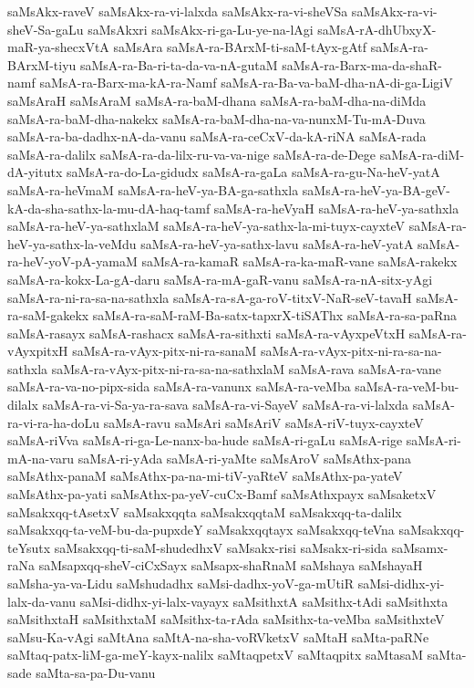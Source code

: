 {saMsAkx-raveV
saMsAkx-ra-vi-lalxda
saMsAkx-ra-vi-sheVSa
saMsAkx-ra-vi-sheV-Sa-gaLu
saMsAkxri
saMsAkx-ri-ga-Lu-ye-na-lAgi
saMsA-rA-dhUbxyX-maR-ya-shecxVtA
saMsAra
saMsA-ra-BArxM-ti-saM-tAyx-gAtf
saMsA-ra-BArxM-tiyu
saMsA-ra-Ba-ri-ta-da-va-nA-gutaM
saMsA-ra-Barx-ma-da-shaR-namf
saMsA-ra-Barx-ma-kA-ra-Namf
saMsA-ra-Ba-va-baM-dha-nA-di-ga-LigiV
saMsAraH
saMsAraM
saMsA-ra-baM-dhana
saMsA-ra-baM-dha-na-diMda
saMsA-ra-baM-dha-nakekx
saMsA-ra-baM-dha-na-va-nunxM-Tu-mA-Duva
saMsA-ra-ba-dadhx-nA-da-vanu
saMsA-ra-ceCxV-da-kA-riNA
saMsA-rada
saMsA-ra-dalilx
saMsA-ra-da-lilx-ru-va-va-nige
saMsA-ra-de-Dege
saMsA-ra-diM-dA-yitutx
saMsA-ra-do-La-gidudx
saMsA-ra-gaLa
saMsA-ra-gu-Na-heV-yatA
saMsA-ra-heVmaM
saMsA-ra-heV-ya-BA-ga-sathxla
saMsA-ra-heV-ya-BA-geV-kA-da-sha-sathx-la-mu-dA-haq-tamf
saMsA-ra-heVyaH
saMsA-ra-heV-ya-sathxla
saMsA-ra-heV-ya-sathxlaM
saMsA-ra-heV-ya-sathx-la-mi-tuyx-cayxteV
saMsA-ra-heV-ya-sathx-la-veMdu
saMsA-ra-heV-ya-sathx-lavu
saMsA-ra-heV-yatA
saMsA-ra-heV-yoV-pA-yamaM
saMsA-ra-kamaR
saMsA-ra-ka-maR-vane
saMsA-rakekx
saMsA-ra-kokx-La-gA-daru
saMsA-ra-mA-gaR-vanu
saMsA-ra-nA-sitx-yAgi
saMsA-ra-ni-ra-sa-na-sathxla
saMsA-ra-sA-ga-roV-titxV-NaR-seV-tavaH
saMsA-ra-saM-gakekx
saMsA-ra-saM-raM-Ba-satx-tapxrX-tiSAThx
saMsA-ra-sa-paRna
saMsA-rasayx
saMsA-rashacx
saMsA-ra-sithxti
saMsA-ra-vAyxpeVtxH
saMsA-ra-vAyxpitxH
saMsA-ra-vAyx-pitx-ni-ra-sanaM
saMsA-ra-vAyx-pitx-ni-ra-sa-na-sathxla
saMsA-ra-vAyx-pitx-ni-ra-sa-na-sathxlaM
saMsA-rava
saMsA-ra-vane
saMsA-ra-va-no-pipx-sida
saMsA-ra-vanunx
saMsA-ra-veMba
saMsA-ra-veM-bu-dilalx
saMsA-ra-vi-Sa-ya-ra-sava
saMsA-ra-vi-SayeV
saMsA-ra-vi-lalxda
saMsA-ra-vi-ra-ha-doLu
saMsA-ravu
saMsAri
saMsAriV
saMsA-riV-tuyx-cayxteV
saMsA-riVva
saMsA-ri-ga-Le-nanx-ba-hude
saMsA-ri-gaLu
saMsA-rige
saMsA-ri-mA-na-varu
saMsA-ri-yAda
saMsA-ri-yaMte
saMsAroV
saMsAthx-pana
saMsAthx-panaM
saMsAthx-pa-na-mi-tiV-yaRteV
saMsAthx-pa-yateV
saMsAthx-pa-yati
saMsAthx-pa-yeV-cuCx-Bamf
saMsAthxpayx
saMsaketxV
saMsakxqq-tAsetxV
saMsakxqqta
saMsakxqqtaM
saMsakxqq-ta-dalilx
saMsakxqq-ta-veM-bu-da-pupxdeY
saMsakxqqtayx
saMsakxqq-teVna
saMsakxqq-teYsutx
saMsakxqq-ti-saM-shudedhxV
saMsakx-risi
saMsakx-ri-sida
saMsamx-raNa
saMsapxqq-sheV-ciCxSayx
saMsapx-shaRnaM
saMshaya
saMshayaH
saMsha-ya-va-Lidu
saMshudadhx
saMsi-dadhx-yoV-ga-mUtiR
saMsi-didhx-yi-lalx-da-vanu
saMsi-didhx-yi-lalx-vayayx
saMsithxtA
saMsithx-tAdi
saMsithxta
saMsithxtaH
saMsithxtaM
saMsithx-ta-rAda
saMsithx-ta-veMba
saMsithxteV
saMsu-Ka-vAgi
saMtAna
saMtA-na-sha-voRVketxV
saMtaH
saMta-paRNe
saMtaq-patx-liM-ga-meY-kayx-nalilx
saMtaqpetxV
saMtaqpitx
saMtasaM
saMta-sade
saMta-sa-pa-Du-vanu
}
